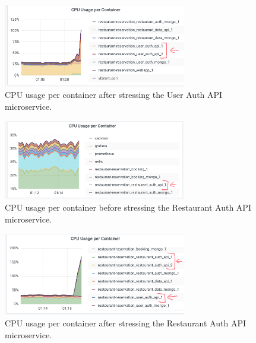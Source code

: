 \begin{figure}
    \begin{center}
        \includegraphics[width=8cm]{./images/cpu_after_user_auth.png}
    \end{center}
    \caption{CPU usage per container after stressing the User Auth API microservice.}
    \label{fig:cpu_after_user_auth}
\end{figure}

\begin{figure}
    \begin{center}
        \includegraphics[width=8cm]{./images/cpu_before_restaurant_auth.png}
    \end{center}
    \caption{CPU usage per container before stressing the Restaurant Auth API microservice.}
    \label{fig:cpu_before_restaurant_auth}
\end{figure}

\begin{figure}
    \begin{center}
        \includegraphics[width=8cm]{./images/cpu_after_restaurant_auth.png}
    \end{center}
    \caption{CPU usage per container after stressing the Restaurant Auth API microservice.}
    \label{fig:cpu_after_restaurant_auth}
\end{figure}
